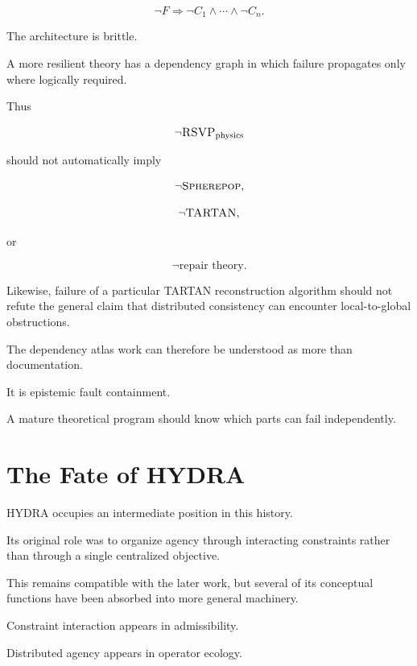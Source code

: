 \documentclass[11pt]{article}
\theoremstyle{remark}
\newcommand{\RSVP}{\textsc{RSVP}}
\newcommand{\HYDRA}{\textsc{HYDRA}}
\newcommand{\TARTAN}{\textsc{TARTAN}}
\newcommand{\Spherepop}{\textsc{Spherepop}}
\begin{document}
\begin{equation}
\neg F
\Rightarrow
\neg C_1\land\cdots\land\neg C_n.
\end{equation}

The architecture is brittle.

A more resilient theory has a dependency graph in which failure propagates only where logically required.

Thus

\begin{equation}
\neg\RSVP_{\mathrm{physics}}
\end{equation}

should not automatically imply

\begin{equation}
\neg\Spherepop,
\end{equation}

\begin{equation}
\neg\TARTAN,
\end{equation}

or

\begin{equation}
\neg\text{repair theory}.
\end{equation}

Likewise, failure of a particular \TARTAN{} reconstruction algorithm should not refute the general claim that distributed consistency can encounter local-to-global obstructions.

The dependency atlas work can therefore be understood as more than documentation.

It is epistemic fault containment.

A mature theoretical program should know which parts can fail independently.

\section{The Fate of HYDRA}

\HYDRA{} occupies an intermediate position in this history.

Its original role was to organize agency through interacting constraints rather than through a single centralized objective.

This remains compatible with the later work, but several of its conceptual functions have been absorbed into more general machinery.

Constraint interaction appears in admissibility.

Distributed agency appears in operator ecology.
\end{document}

